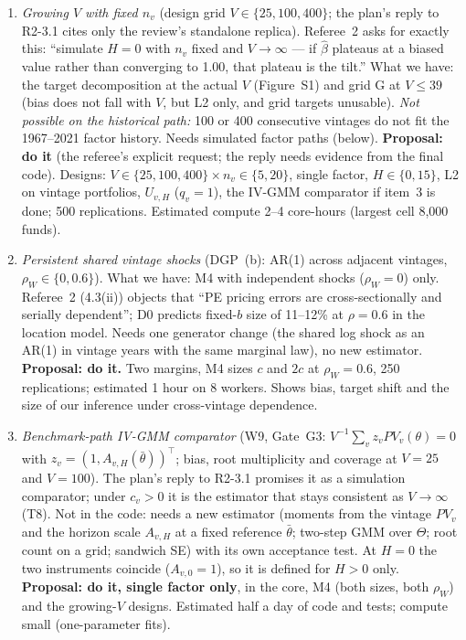 \documentclass[11pt]{article}
\begin{document}
\begin{itemize}
  \begin{enumerate}
  \item \emph{Growing $V$ with fixed $n_v$} (design grid $V\in\{25,100,400\}$; the plan's reply to R2-3.1 cites only the review's standalone replica). Referee~2 asks for exactly this: ``simulate $H=0$ with $n_v$ fixed and $V\to\infty$ --- if $\hat\beta$ plateaus at a biased value rather than converging to 1.00, that plateau is the tilt.'' What we have: the target decomposition at the actual $V$ (Figure~S1) and grid G at $V\le39$ (bias does not fall with $V$, but L2 only, and grid targets unusable). \emph{Not possible on the historical path:} 100 or 400 consecutive vintages do not fit the 1967--2021 factor history. Needs simulated factor paths (below). \textbf{Proposal: do it} (the referee's explicit request; the reply needs evidence from the final code). Designs: $V\in\{25,100,400\}\times n_v\in\{5,20\}$, single factor, $H\in\{0,15\}$, L2 on vintage portfolios, $U_{v,H}$ ($q_v=1$), the IV-GMM comparator if item~3 is done; 500 replications. Estimated compute 2--4 core-hours (largest cell 8{,}000 funds).
  \item \emph{Persistent shared vintage shocks} (DGP~(b): AR(1) across adjacent vintages, $\rho_W\in\{0,0.6\}$). What we have: M4 with independent shocks ($\rho_W=0$) only. Referee~2 (4.3(ii)) objects that ``PE pricing errors are cross-sectionally and serially dependent''; D0 predicts fixed-$b$ size of 11--12\% at $\rho=0.6$ in the location model. Needs one generator change (the shared log shock as an AR(1) in vintage years with the same marginal law), no new estimator. \textbf{Proposal: do it.} Two margins, M4 sizes $c$ and $2c$ at $\rho_W=0.6$, 250 replications; estimated 1 hour on 8 workers. Shows bias, target shift and the size of our inference under cross-vintage dependence.
  \item \emph{Benchmark-path IV-GMM comparator} (W9, Gate~G3: $V^{-1}\sum_vz_vPV_v(\theta)=0$ with $z_v=(1,A_{v,H}(\bar\theta))^\top$; bias, root multiplicity and coverage at $V=25$ and $V=100$). The plan's reply to R2-3.1 promises it as a simulation comparator; under $c_v>0$ it is the estimator that stays consistent as $V\to\infty$ (T8). Not in the code: needs a new estimator (moments from the vintage $PV_v$ and the horizon scale $A_{v,H}$ at a fixed reference $\bar\theta$; two-step GMM over $\Theta$; root count on a grid; sandwich SE) with its own acceptance test. At $H=0$ the two instruments coincide ($A_{v,0}=1$), so it is defined for $H>0$ only. \textbf{Proposal: do it, single factor only}, in the core, M4 (both sizes, both $\rho_W$) and the growing-$V$ designs. Estimated half a day of code and tests; compute small (one-parameter fits).

\end{enumerate}
\end{itemize}
\end{document}
